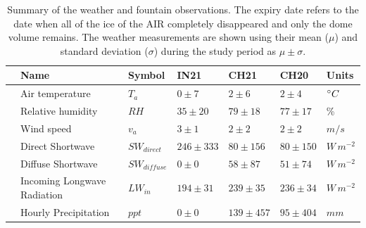 \documentclass[utf8]{frontiersSCNS}
\begin{document}
\begin{table}
  \caption{Summary of the weather and fountain observations. The expiry date refers to the date when  all of the
  ice of the AIR completely disappeared and only the dome volume remains. The weather measurements are shown
using their mean ($\mu$) and standard deviation ($\sigma$) during the study period as $\mu \pm \sigma$. }

	\label{tab:Observations}
	\begin{tabular}{@{}|lllllll|@{}}
		\toprule
		\textbf{}              & \textbf{Name}               & \textbf{Symbol} & \textbf{IN21} &
		\textbf{CH21}          & \textbf{CH20}               & \textbf{Units}                                                              \\ \midrule
		\multicolumn{1}{|l|}{\multirow{9}{*}{\rotatebox[origin=c]{90}{Weather}}}
		                       & Air temperature             & $T_a    $       & $0 \pm 7$     & $2 \pm 6$    & $2
		\pm 4$                 & $\degree C$                                                                                               \\
		\multicolumn{1}{|l|}{} & Relative humidity           & $RH     $       & $35 \pm 20$   & $79 \pm 18$  & $77
		\pm 17$                & \%                                                                                                        \\
		\multicolumn{1}{|l|}{} & Wind speed                  & $v_a        $   & $3 \pm 1$     & $2 \pm 2$    &
		$2 \pm 2$              & $m/s$                                                                                                     \\
		\multicolumn{1}{|l|}{} & Direct Shortwave            & $SW_{direct} $  & $246 \pm 333$ & $80 \pm 156$
		                       & $80 \pm 150$                & $W\,m^{-2}$                                                                 \\
		\multicolumn{1}{|l|}{} & Diffuse Shortwave           & $SW_{diffuse}$  & $0 \pm 0$     & $58 \pm 87$  & $51 \pm 74$  & $W\,m^{-2}$ \\
		\multicolumn{1}{|l|}{} & Incoming Longwave Radiation & $LW_{in}$       & $194 \pm 31$  & $239 \pm 35$ & $236 \pm 34$ & $W\,m^{-2}$ \\
		\multicolumn{1}{|l|}{} & Hourly Precipitation        & $ppt        $   & $0 \pm 0$     & $139 \pm
		457$                   & $95 \pm 404$                & $mm$                                                                        \\

\end{tabular}
\end{table}
\end{document}
